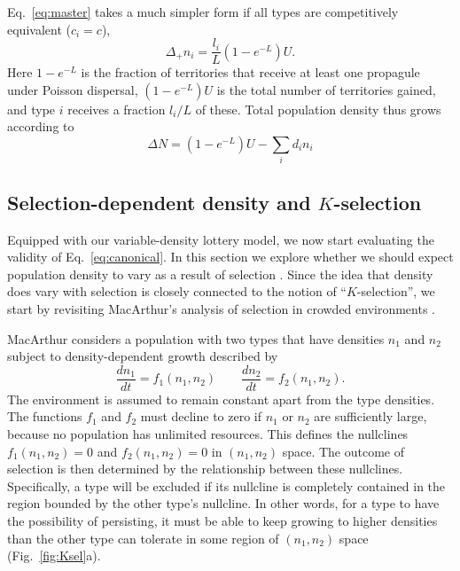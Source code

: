 \documentclass[12pt]{article}
\begin{document}
Eq.~\eqref{eq:master} takes a much simpler form if all types are competitively equivalent ($c_i=c$),
\begin{equation}
\Delta_+ n_i = \frac{l_i}{L}(1-e^{-L})U. \label{eq:masterequalc}
\end{equation}
Here $1-e^{-L}$ is the fraction of territories that receive at least one propagule under Poisson dispersal, $(1-e^{-L})U$ is the total number of territories gained, and type $i$ receives a fraction $l_i/L$ of these. Total population density thus grows according to
\begin{equation}
\Delta N=(1-e^{-L})U-\sum_i d_i n_i \label{eq:Nmaster}
\end{equation}

\subsection*{Selection-dependent density and $K$-selection}

Equipped with our variable-density lottery model, we now start evaluating the validity of Eq.~\eqref{eq:canonical}. In this section we explore whether we should expect population density to vary as a result of selection \citep{prout_1980}. Since the idea that density does vary with selection is closely connected to the notion of ``$K$-selection'', we start by revisiting MacArthur's analysis of selection in crowded environments \citep{macarthur_1967}. 

MacArthur considers a population with two types that have densities $n_1$ and $n_2$ subject to density-dependent growth described by
\begin{equation}
\frac{d n_1}{d t}=f_1(n_1,n_2)\qquad\frac{d n_2}{d t}=f_2(n_1,n_2). \label{eq:macgeneral}
\end{equation}
The environment is assumed to remain constant apart from the type densities. The functions $f_1$ and $f_2$ must decline to zero if $n_1$ or $n_2$ are sufficiently large, because no population has unlimited resources. This defines the nullclines $f_1(n_1,n_2)=0$ and $f_2(n_1,n_2)=0$ in $(n_1,n_2)$ space. The outcome of selection is then determined by the relationship between these nullclines. Specifically, a type will be excluded if its nullcline is completely contained in the region bounded by the other type's nullcline. In other words, for a type to have the possibility of persisting, it must be able to keep growing to higher densities than the other type can tolerate in some region of $(n_1,n_2)$ space (Fig.~\ref{fig:Ksel}a).
\end{document}
